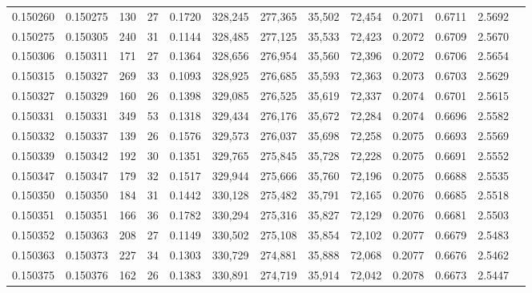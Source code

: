\begin{tabular}{rrrrrrrrrrrrr}
0.150260 & 0.150275 &   130 &  27 &                                     0.1720 & 328,245 & 277,365 &  35,502 &  72,454 & 0.2071 & 0.6711 & 2.5692 \\
0.150275 & 0.150305 &   240 &  31 &                                     0.1144 & 328,485 & 277,125 &  35,533 &  72,423 & 0.2072 & 0.6709 & 2.5670 \\
0.150306 & 0.150311 &   171 &  27 &                                     0.1364 & 328,656 & 276,954 &  35,560 &  72,396 & 0.2072 & 0.6706 & 2.5654 \\
0.150315 & 0.150327 &   269 &  33 &                                     0.1093 & 328,925 & 276,685 &  35,593 &  72,363 & 0.2073 & 0.6703 & 2.5629 \\
0.150327 & 0.150329 &   160 &  26 &                                     0.1398 & 329,085 & 276,525 &  35,619 &  72,337 & 0.2074 & 0.6701 & 2.5615 \\
0.150331 & 0.150331 &   349 &  53 &                                     0.1318 & 329,434 & 276,176 &  35,672 &  72,284 & 0.2074 & 0.6696 & 2.5582 \\
0.150332 & 0.150337 &   139 &  26 &                                     0.1576 & 329,573 & 276,037 &  35,698 &  72,258 & 0.2075 & 0.6693 & 2.5569 \\
0.150339 & 0.150342 &   192 &  30 &                                     0.1351 & 329,765 & 275,845 &  35,728 &  72,228 & 0.2075 & 0.6691 & 2.5552 \\
0.150347 & 0.150347 &   179 &  32 &                                     0.1517 & 329,944 & 275,666 &  35,760 &  72,196 & 0.2075 & 0.6688 & 2.5535 \\
0.150350 & 0.150350 &   184 &  31 &                                     0.1442 & 330,128 & 275,482 &  35,791 &  72,165 & 0.2076 & 0.6685 & 2.5518 \\
0.150351 & 0.150351 &   166 &  36 &                                     0.1782 & 330,294 & 275,316 &  35,827 &  72,129 & 0.2076 & 0.6681 & 2.5503 \\
0.150352 & 0.150363 &   208 &  27 &                                     0.1149 & 330,502 & 275,108 &  35,854 &  72,102 & 0.2077 & 0.6679 & 2.5483 \\
0.150363 & 0.150373 &   227 &  34 &                                     0.1303 & 330,729 & 274,881 &  35,888 &  72,068 & 0.2077 & 0.6676 & 2.5462 \\
0.150375 & 0.150376 &   162 &  26 &                                     0.1383 & 330,891 & 274,719 &  35,914 &  72,042 & 0.2078 & 0.6673 & 2.5447 \\

\end{tabular}
